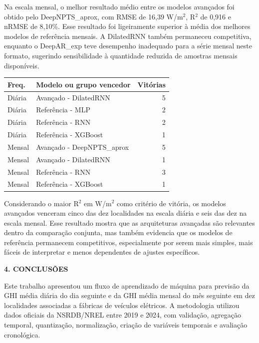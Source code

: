 \documentclass[12pt,a4paper]{article}
\begin{document}
Na escala mensal, o melhor resultado médio entre os modelos avançados foi obtido pelo DeepNPTS\_aprox, com RMSE de 16,39 W/m$^2$, R$^2$ de 0,916 e nRMSE de 8,10\%. Esse resultado foi ligeiramente superior à média dos melhores modelos de referência mensais. A DilatedRNN também permaneceu competitiva, enquanto o DeepAR\_exp teve desempenho inadequado para a série mensal neste formato, sugerindo sensibilidade à quantidade reduzida de amostras mensais disponíveis.

\vspace{6pt}

\begin{center}
\small
\begin{tabular}{llr}
\toprule
\textbf{Freq.} & \textbf{Modelo ou grupo vencedor} & \textbf{Vitórias} \\
\midrule
Diária & Avançado - DilatedRNN & 5 \\
Diária & Referência - MLP & 2 \\
Diária & Referência - RNN & 2 \\
Diária & Referência - XGBoost & 1 \\
Mensal & Avançado - DeepNPTS\_aprox & 5 \\
Mensal & Avançado - DilatedRNN & 1 \\
Mensal & Referência - RNN & 3 \\
Mensal & Referência - XGBoost & 1 \\
\bottomrule
\end{tabular}
\end{center}

\vspace{6pt}

Considerando o maior R$^2$ em W/m$^2$ como critério de vitória, os modelos avançados venceram cinco das dez localidades na escala diária e seis das dez na escala mensal. Esse resultado mostra que as arquiteturas avançadas são relevantes dentro da comparação conjunta, mas também evidencia que os modelos de referência permanecem competitivos, especialmente por serem mais simples, mais fáceis de interpretar e menos dependentes de ajustes específicos.

\vspace{12pt}

\noindent\textbf{4. CONCLUSÕES}

Este trabalho apresentou um fluxo de aprendizado de máquina para previsão da GHI média diária do dia seguinte e da GHI média mensal do mês seguinte em dez localidades associadas a fábricas de veículos elétricos. A metodologia utilizou dados oficiais da NSRDB/NREL entre 2019 e 2024, com validação, agregação temporal, quantização, normalização, criação de variáveis temporais e avaliação cronológica.
\end{document}
